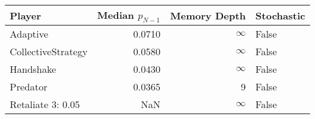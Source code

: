\begin{tabular}{lrrl}
\toprule
             Player &  Median $p_{N-1}$ &  Memory Depth & Stochastic \\
\midrule
           Adaptive &            0.0710 &            \(\infty\) &      False \\
 CollectiveStrategy &            0.0580 &            \(\infty\) &      False \\
          Handshake &            0.0430 &            \(\infty\) &      False \\
           Predator &            0.0365 &             9 &      False \\
  Retaliate 3: 0.05 &               NaN &            \(\infty\) &      False \\
\bottomrule
\end{tabular}
